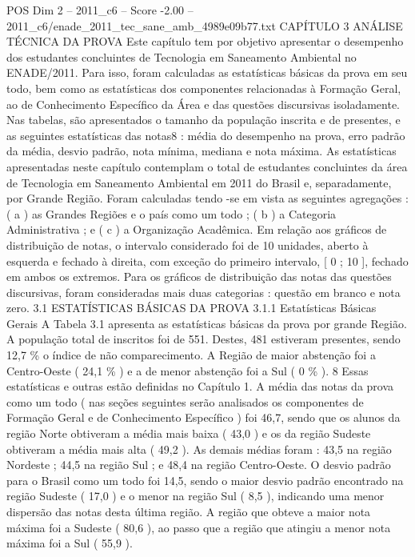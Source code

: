 \begin{textsample}{POS Dim 2 – 2011\_c6 – Score -2.00 – 2011\_c6/enade\_2011\_tec\_sane\_amb\_4989e09b77.txt}  \label{ex:f2_pos_405}
CAPÍTULO 3 ANÁLISE TÉCNICA DA PROVA Este capítulo tem por objetivo apresentar o desempenho dos estudantes concluintes de Tecnologia em Saneamento Ambiental no ENADE/2011.
Para isso, foram calculadas as estatísticas básicas da prova em seu todo, bem como as estatísticas dos componentes relacionadas à Formação Geral, ao de Conhecimento Específico da Área e das questões discursivas isoladamente.
Nas tabelas, são apresentados o tamanho da população inscrita e de presentes, e as seguintes estatísticas das notas8 : média do desempenho na prova, erro padrão da média, desvio padrão, nota mínima, mediana e nota máxima.
As estatísticas apresentadas neste capítulo contemplam o total de estudantes concluintes da área de Tecnologia em Saneamento Ambiental em 2011 do Brasil e, separadamente, por Grande Região.
Foram calculadas tendo -se em vista as seguintes agregações : ( a ) as Grandes Regiões e o país como um todo ; ( b ) a Categoria Administrativa ; e ( c ) a Organização Acadêmica.
Em relação aos gráficos de distribuição de notas, o intervalo considerado foi de 10 unidades, aberto à esquerda e fechado à direita, com exceção do primeiro intervalo, [ 0 ; 10 ], fechado em ambos os extremos.
Para os gráficos de distribuição das notas das questões discursivas, foram consideradas mais duas categorias : questão em branco e nota zero. 3.1 ESTATÍSTICAS BÁSICAS DA PROVA 3.1.1 Estatísticas Básicas Gerais A Tabela 3.1 apresenta as estatísticas básicas da prova por grande Região.
A população total de inscritos foi de 551.
Destes, 481 estiveram presentes, sendo 12,7 \% o índice de não comparecimento.
A Região de maior abstenção foi a Centro-Oeste ( 24,1 \% ) e a de menor abstenção foi a Sul ( 0 \% ). 8 Essas estatísticas e outras estão definidas no Capítulo 1.
A média das notas da prova como um todo ( nas seções seguintes serão analisados os componentes de Formação Geral e de Conhecimento Específico ) foi 46,7, sendo que os alunos da região Norte obtiveram a média mais baixa ( 43,0 ) e os da região Sudeste obtiveram a média mais alta ( 49,2 ).
As demais médias foram : 43,5 na região Nordeste ; 44,5 na região Sul ; e 48,4 na região Centro-Oeste.
O desvio padrão para o Brasil como um todo foi 14,5, sendo o maior desvio padrão encontrado na região Sudeste ( 17,0 ) e o menor na região Sul ( 8,5 ), indicando uma menor dispersão das notas desta última região.
A região que obteve a maior nota máxima foi a Sudeste ( 80,6 ), ao passo que a região que atingiu a menor nota máxima foi a Sul ( 55,9 ).

\end{textsample}
